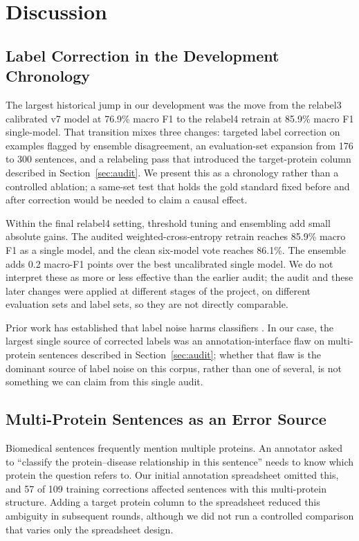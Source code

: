 \documentclass[sn-basic,pdflatex]{sn-jnl}
\begin{document}
\section{Discussion}
\label{sec:discussion}

\subsection{Label Correction in the Development Chronology}

The largest historical jump in our development was the move from the relabel3 calibrated v7 model at 76.9\% macro F1 to the relabel4 retrain at 85.9\% macro F1 single-model. That transition mixes three changes: targeted label correction on examples flagged by ensemble disagreement, an evaluation-set expansion from 176 to 300 sentences, and a relabeling pass that introduced the target-protein column described in Section~\ref{sec:audit}. We present this as a chronology rather than a controlled ablation; a same-set test that holds the gold standard fixed before and after correction would be needed to claim a causal effect.

Within the final relabel4 setting, threshold tuning and ensembling add small absolute gains. The audited weighted-cross-entropy retrain reaches 85.9\% macro F1 as a single model, and the clean six-model vote reaches 86.1\%. The ensemble adds 0.2 macro-F1 points over the best uncalibrated single model. We do not interpret these as more or less effective than the earlier audit; the audit and these later changes were applied at different stages of the project, on different evaluation sets and label sets, so they are not directly comparable.

Prior work has established that label noise harms classifiers \citep{northcutt2021confident,song2022learning}. In our case, the largest single source of corrected labels was an annotation-interface flaw on multi-protein sentences described in Section~\ref{sec:audit}; whether that flaw is the dominant source of label noise on this corpus, rather than one of several, is not something we can claim from this single audit.

\subsection{Multi-Protein Sentences as an Error Source}

Biomedical sentences frequently mention multiple proteins.
An annotator asked to ``classify the protein--disease relationship in this sentence'' needs to know which protein the question refers to. Our initial annotation spreadsheet omitted this, and 57 of 109 training corrections affected sentences with this multi-protein structure. Adding a target protein column to the spreadsheet reduced this ambiguity in subsequent rounds, although we did not run a controlled comparison that varies only the spreadsheet design.
\end{document}
